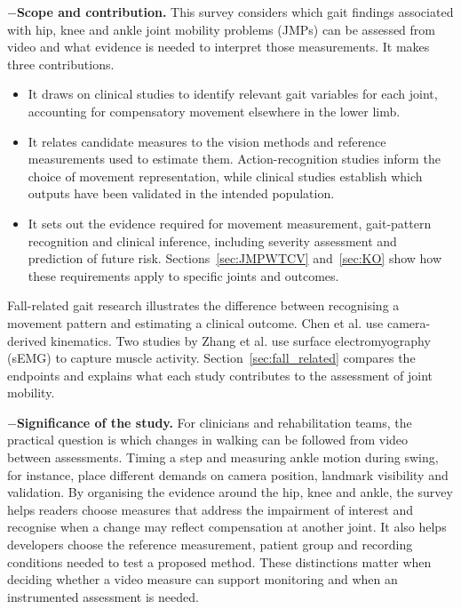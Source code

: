 \documentclass[12pt,nopreprintline]{elsarticle}
\begin{document}
\begin{revision}
$-$\noindent\textbf{Scope and contribution.} This survey considers which gait findings associated with hip, knee and ankle joint mobility problems (JMPs) can be assessed from video and what evidence is needed to interpret those measurements. It makes three contributions.
\begin{itemize}
\item It draws on clinical studies to identify relevant gait variables for each joint, accounting for compensatory movement elsewhere in the lower limb.
\item It relates candidate measures to the vision methods and reference measurements used to estimate them. Action-recognition studies inform the choice of movement representation, while clinical studies establish which outputs have been validated in the intended population.
\item It sets out the evidence required for movement measurement, gait-pattern recognition and clinical inference, including severity assessment and prediction of future risk. Sections~\ref{sec:JMPWTCV} and~\ref{sec:KO} show how these requirements apply to specific joints and outcomes.
\end{itemize}

Fall-related gait research illustrates the difference between recognising a movement pattern and estimating a clinical outcome. Chen et al. \cite{chen2022computer} use camera-derived kinematics. Two studies by Zhang et al. \cite{zhang2025myoelectric,zhang2024fall} use surface electromyography (sEMG) to capture muscle activity. Section~\ref{sec:fall_related} compares the endpoints and explains what each study contributes to the assessment of joint mobility.
\end{revision}

\begin{redrevision}
$-$\noindent{}\label{loc:significance}\textbf{Significance of the study.}
For clinicians and rehabilitation teams, the practical question is which changes in walking can be followed from video between assessments. Timing a step and measuring ankle motion during swing, for instance, place different demands on camera position, landmark visibility and validation. By organising the evidence around the hip, knee and ankle, the survey helps readers choose measures that address the impairment of interest and recognise when a change may reflect compensation at another joint. It also helps developers choose the reference measurement, patient group and recording conditions needed to test a proposed method. These distinctions matter when deciding whether a video measure can support monitoring and when an instrumented assessment is needed.
\end{redrevision}
\end{document}

